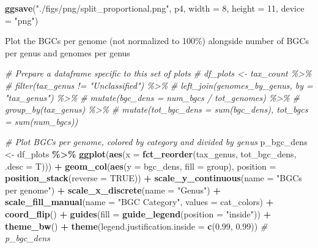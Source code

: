 \documentclass[
]{article}
\newenvironment{Shaded}{\begin{snugshade}}{\end{snugshade}}
\newcommand{\AttributeTok}[1]{\textcolor[rgb]{0.13,0.29,0.53}{#1}}
\newcommand{\CommentTok}[1]{\textcolor[rgb]{0.56,0.35,0.01}{\textit{#1}}}
\newcommand{\ConstantTok}[1]{\textcolor[rgb]{0.56,0.35,0.01}{#1}}
\newcommand{\DecValTok}[1]{\textcolor[rgb]{0.00,0.00,0.81}{#1}}
\newcommand{\FloatTok}[1]{\textcolor[rgb]{0.00,0.00,0.81}{#1}}
\newcommand{\FunctionTok}[1]{\textcolor[rgb]{0.13,0.29,0.53}{\textbf{#1}}}
\newcommand{\NormalTok}[1]{#1}
\newcommand{\OtherTok}[1]{\textcolor[rgb]{0.56,0.35,0.01}{#1}}
\newcommand{\SpecialCharTok}[1]{\textcolor[rgb]{0.81,0.36,0.00}{\textbf{#1}}}
\newcommand{\StringTok}[1]{\textcolor[rgb]{0.31,0.60,0.02}{#1}}
\begin{document}
\begin{Shaded}
\begin{Highlighting}[]
\FunctionTok{ggsave}\NormalTok{(}\StringTok{"./figs/png/split\_proportional.png"}\NormalTok{, p4, }\AttributeTok{width =} \DecValTok{8}\NormalTok{, }\AttributeTok{height =} \DecValTok{11}\NormalTok{, }\AttributeTok{device =} \StringTok{"png"}\NormalTok{)}
\end{Highlighting}
\end{Shaded}

Plot the BGCs per genome (not normalized to 100\%) alongside number of
BGCs per genus and genomes per genus

\begin{Shaded}
\begin{Highlighting}[]
\CommentTok{\# Prepare a dataframe specific to this set of plots}
\CommentTok{\# df\_plots \textless{}{-} tax\_count \%\textgreater{}\%}
\CommentTok{\#   filter(tax\_genus != "Unclassified") \%\textgreater{}\%}
\CommentTok{\#   left\_join(genomes\_by\_genus, by = "tax\_genus") \%\textgreater{}\%}
\CommentTok{\#   mutate(bgc\_dens = num\_bgcs / tot\_genomes) \%\textgreater{}\%}
\CommentTok{\#   group\_by(tax\_genus) \%\textgreater{}\%}
\CommentTok{\#   mutate(tot\_bgc\_dens = sum(bgc\_dens), tot\_bgcs = sum(num\_bgcs))}

\CommentTok{\# Plot BGCs per genome, colored by category and divided by genus}
\NormalTok{p\_bgc\_dens }\OtherTok{\textless{}{-}}\NormalTok{ df\_plots }\SpecialCharTok{\%\textgreater{}\%}
  \FunctionTok{ggplot}\NormalTok{(}\FunctionTok{aes}\NormalTok{(}\AttributeTok{x =} \FunctionTok{fct\_reorder}\NormalTok{(tax\_genus, tot\_bgc\_dens, }\AttributeTok{.desc =}\NormalTok{ T))) }\SpecialCharTok{+}
  \FunctionTok{geom\_col}\NormalTok{(}\FunctionTok{aes}\NormalTok{(}\AttributeTok{y =}\NormalTok{ bgc\_dens, }\AttributeTok{fill =}\NormalTok{ group), }\AttributeTok{position =} \FunctionTok{position\_stack}\NormalTok{(}\AttributeTok{reverse =} \ConstantTok{TRUE}\NormalTok{)) }\SpecialCharTok{+}
  \FunctionTok{scale\_y\_continuous}\NormalTok{(}\AttributeTok{name =} \StringTok{"BGCs per genome"}\NormalTok{) }\SpecialCharTok{+}
  \FunctionTok{scale\_x\_discrete}\NormalTok{(}\AttributeTok{name =} \StringTok{"Genus"}\NormalTok{) }\SpecialCharTok{+}
  \FunctionTok{scale\_fill\_manual}\NormalTok{(}\AttributeTok{name =} \StringTok{"BGC Category"}\NormalTok{, }\AttributeTok{values =}\NormalTok{ cat\_colors) }\SpecialCharTok{+}
  \FunctionTok{coord\_flip}\NormalTok{() }\SpecialCharTok{+}
  \FunctionTok{guides}\NormalTok{(}\AttributeTok{fill =} \FunctionTok{guide\_legend}\NormalTok{(}\AttributeTok{position =} \StringTok{"inside"}\NormalTok{)) }\SpecialCharTok{+}
  \FunctionTok{theme\_bw}\NormalTok{() }\SpecialCharTok{+}
  \FunctionTok{theme}\NormalTok{(}\AttributeTok{legend.justification.inside =} \FunctionTok{c}\NormalTok{(}\FloatTok{0.99}\NormalTok{, }\FloatTok{0.99}\NormalTok{))}
\CommentTok{\# p\_bgc\_dens}


\end{Highlighting}
\end{Shaded}
\end{document}

